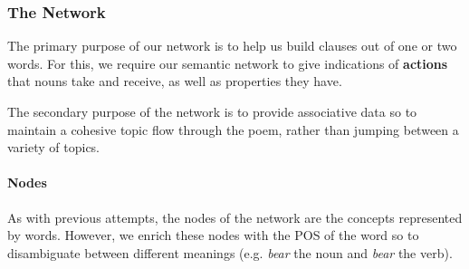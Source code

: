 \subsubsection{The Network}
The primary purpose of our network is to help us build clauses out of one or two words. For this, we require our semantic network to give indications of \textbf{actions} that nouns take and receive, as well as properties they have.

The secondary purpose of the network is to provide associative data so to maintain a cohesive topic flow through the poem, rather than jumping between a variety of topics. 

\paragraph{Nodes}
As with previous attempts, the nodes of the network are the concepts represented by words. However, we enrich these nodes with the POS of the word so to disambiguate between different meanings (e.g. \textit{bear} the noun and \textit{bear} the verb).


